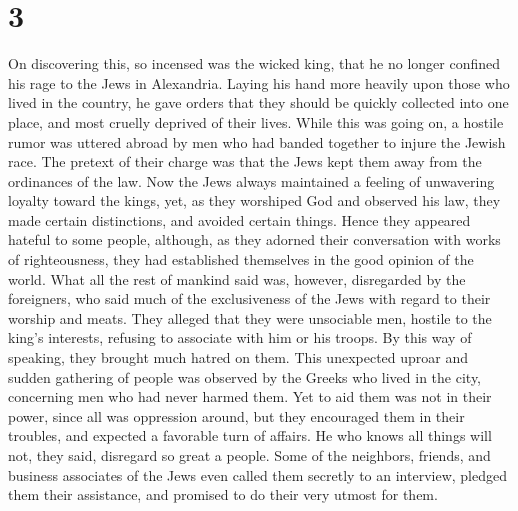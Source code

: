 \hypertarget{section-2}{%
\section{3}\label{section-2}}

 On discovering this, so incensed was the wicked king,
that he no longer confined his rage to the Jews in Alexandria. Laying
his hand more heavily upon those who lived in the country, he gave
orders that they should be quickly collected into one place, and most
cruelly deprived of their lives.  While this was going on,
a hostile rumor was uttered abroad by men who had banded together to
injure the Jewish race. The pretext of their charge was that the Jews
kept them away from the ordinances of the law.  Now the
Jews always maintained a feeling of unwavering loyalty toward the kings,
 yet, as they worshiped God and observed his law, they
made certain distinctions, and avoided certain things. Hence they
appeared hateful to some people,  although, as they
adorned their conversation with works of righteousness, they had
established themselves in the good opinion of the world. 
What all the rest of mankind said was, however, disregarded by the
foreigners,  who said much of the exclusiveness of the
Jews with regard to their worship and meats. They alleged that they were
unsociable men, hostile to the king's interests, refusing to associate
with him or his troops. By this way of speaking, they brought much
hatred on them.  This unexpected uproar and sudden
gathering of people was observed by the Greeks who lived in the city,
concerning men who had never harmed them. Yet to aid them was not in
their power, since all was oppression around, but they encouraged them
in their troubles, and expected a favorable turn of affairs.
 He who knows all things will not, they said, disregard so
great a people.  Some of the neighbors, friends, and
business associates of the Jews even called them secretly to an
interview, pledged them their assistance, and promised to do their very
utmost for them.

